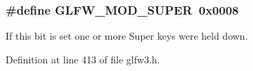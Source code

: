 \hypertarget{group__mods_ga6b64ba10ea0227cf6f42efd0a220aba1}{}
\subsubsection[{G\+L\+F\+W\+\_\+\+M\+O\+D\+\_\+\+S\+U\+P\+E\+R}]{\setlength{\rightskip}{0pt plus 5cm}\#define G\+L\+F\+W\+\_\+\+M\+O\+D\+\_\+\+S\+U\+P\+E\+R~0x0008}\label{group__mods_ga6b64ba10ea0227cf6f42efd0a220aba1}


If this bit is set one or more Super keys were held down. 



Definition at line 413 of file glfw3.\+h.

